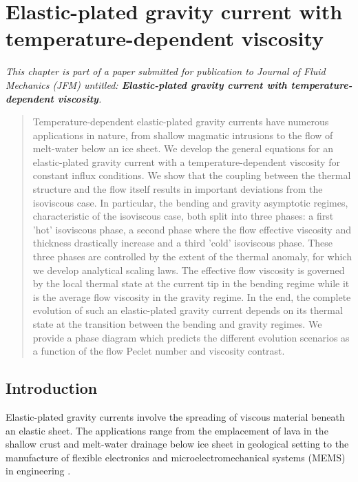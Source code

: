 \chapter{Elastic-plated  gravity  current  with  temperature-dependent
  viscosity}
\label{C3-JFM}

\textit{This chapter is part of a paper submitted for publication to Journal of Fluid
  Mechanics  (JFM)  untitled: \textbf{Elastic-plated  gravity  current
    with temperature-dependent viscosity}.}


\minitoc

\begin{abstract}
  Temperature-dependent elastic-plated gravity  currents have numerous
  applications in nature, from shallow magmatic intrusions to the flow
  of melt-water below  an ice sheet. We develop  the general equations
  for an  elastic-plated gravity current with  a temperature-dependent
  viscosity for constant influx conditions.  We show that the coupling
  between  the  thermal  structure  and the  flow  itself  results  in
  important deviations  from the  isoviscous case. In  particular, the
  bending  and  gravity  asymptotic  regimes,  characteristic  of  the
  isoviscous  case,  both  split  into three  phases:  a  first  'hot'
  isoviscous phase, a second phase  where the flow effective viscosity
  and  thickness drastically  increase and  a third  'cold' isoviscous
  phase.   These three  phases are  controlled  by the  extent of  the
  thermal anomaly, for  which we develop analytical  scaling laws. The
  effective flow viscosity  is governed by the local  thermal state at
  the current tip  in the bending regime while it  is the average flow
  viscosity in the gravity regime.  In the end, the complete evolution
  of such  an elastic-plated  gravity current  depends on  its thermal
  state at the transition between  the bending and gravity regimes. We
  provide  a  phase diagram  which  predicts  the different  evolution
  scenarios  as a  function of  the flow  Peclet number  and viscosity
  contrast.

\end{abstract}


\section{Introduction}

Elastic-plated  gravity  currents  involve the  spreading  of  viscous
material beneath  an elastic  sheet. The  applications range  from the
emplacement      of      lava      in      the      shallow      crust
\citep{Michaut:2011kg,Bunger:2011cb} and melt-water drainage below ice
sheet  \citep{Das:2008in,Tsai:2010ev}  in  geological setting  to  the
manufacture of flexible electronics and microelectromechanical systems
(MEMS) in engineering \citep{Hosoi:2004dn}.

